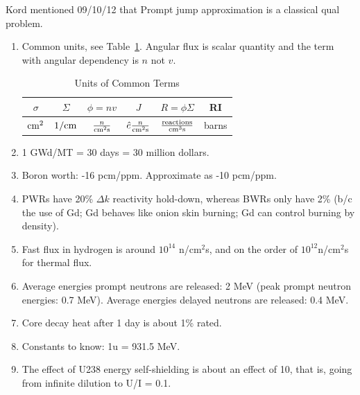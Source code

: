 \documentclass{school-22.211-notes}
\date{May 23, 2012}
\begin{document}
\maketitle

Kord mentioned 09/10/12 that Prompt jump approximation is a classical qual problem.

\begin{enumerate}
\item Common units, see Table~\ref{units}. Angular flux is scalar quantity and the term with angular dependency is $n$ not $v$. 
\begin{table}[ht]
  \centering
  \begin{tabular}{|c|c|c|c|c|c|} \hline
   $\sigma$ & $\Sigma$ & $\phi = nv$  & $J$ & $R = \phi \Sigma$ & RI  \\ \hline
   $\mathrm{cm}^2$ & $1/\mathrm{cm}$ & $\frac{n}{\mathrm{cm}^2 \mathrm{s}}$  & $\hat{e} \frac{n}{\mathrm{cm}^2 \mathrm{s}}$ & $\frac{\mathrm{reactions}}{\mathrm{cm}^3 \mathrm{s}}$ & barns \\ \hline
  \end{tabular}
  \caption{Units of Common Terms} \label{units}
\end{table}
\item 1 GWd/MT = 30 days = 30 million dollars. 
\item Boron worth: -16 pcm/ppm. Approximate as -10 pcm/ppm. 
\item PWRs have 20\% $\Delta k$ reactivity hold-down, whereas BWRs only have 2\% (b/c the use of Gd; Gd behaves like onion skin burning; Gd can control burning by density). 
\item Fast flux in hydrogen is around $10^{14}$ n/cm$^2$s, and on the order of $10^{12}$n/cm$^2$s for thermal flux. 
\item Average energies prompt neutrons are released: 2 MeV (peak prompt neutron energies: 0.7 MeV). Average energies delayed neutrons are released: 0.4 MeV. 
\item Core decay heat after 1 day is about 1\% rated. 
\item Constants to know: 1u = 931.5 MeV. 
\item The effect of U238 energy self-shielding is about an effect of 10, that is, going from infinite dilution to U/I = 0.1. 


\end{enumerate}
\end{document}
